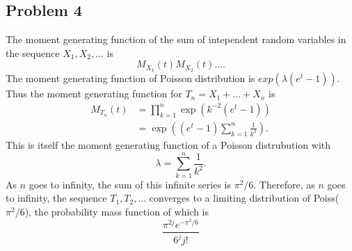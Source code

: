 \documentclass{article}
\begin{document}
\subsection*{Problem 4}
The moment generating function of the sum of intependent random variables in the sequence $X_1, X_2, ...$ is 
\[M_{X_1}(t)M_{X_2}(t)... .\]
The moment generating function of Poisson distribution is $exp(\lambda(e^t-1))$. Thus the moment generating function for $T_n = X_1 + ... + X_n$ is
\[\begin{aligned}M_{T_n}(t) &= \prod_{k=1}^{n} \exp\left(k^{-2}\left(e^t - 1\right)\right) \\
&= \exp\left(\left(e^t-1\right)\sum_{k=1}^{n} \frac{1}{k^2}\right).\end{aligned}\] 
This is itself the moment generating function of a Poisson distrubution with \[\lambda = \sum_{k=1}^{n} \frac{1}{k^2}.\]
As $n$ goes to infinity, the sum of this infinite series is $\pi^2/6$. Therefore, as $n$ goes to infinity, the sequence $T_1, T_2, ...$ converges to a limiting distribution of Poiss($\pi^2/6$), the probability mass function of which is 
\[\frac{\pi^{2j} e^{-\pi^2/6}}{6^j j!}\]




\iffalse
The probability function of a Poisson random variable with $E(x) = \lambda$ is \[\frac{\lambda^je^{-\lambda}}{j!},\] so for $X_k$ with $E(X_k) = k^{-2}$, \[f_{X_k}(x) = \frac{k^{-2j}\exp\left(-\frac{1}{k^2}\right)}{j!},\] for all non-negative integrers $j$, and $0$ otherwise.
$T_n$ can then be expressed as the sum of a series 
\[\begin{aligned}
T_n &= \sum_{k=1}^{n}\frac{k^{-2j}\exp\left(-\frac{1}{k^2}\right)}{j!} \\
&=\frac{1}{j!}\sum_{k=1}^{n}\, k^{-2j}e^{-\frac{1}{k^2}}.\end{aligned}\]


Since $e^{-\frac{1}{k^2}} <= 1 $ for all integers $k > 0$, then $k^{-2j}e^{-\frac{1}{k^2}} \leq k^{-2j}$ as well. $k^{-2j}$ or $\frac{1}{k^{2j}}$ is a basic null sequence, so $k^{-2j}e^{-\frac{1}{k^2}}$ is also a null sequence. Since $k^{-2j}e^{-\frac{1}{k^2}}$ is a null sequence, then  $\sum_{k=1}^{n}\, k^{-2j}e^{-\frac{1}{k^2}}$ is a convergent series. Therefore the last entry in the sequence $T_n$, is itself a convergent series. 
\fi
\end{document}
